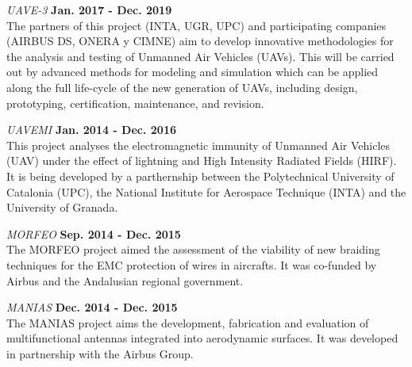 \documentclass[margin,line]{res}
\begin{document}
\begin{resume}

\begin{minipage}{\textwidth}
  {\em UAVE-3} \hfill {\bf Jan. 2017 - Dec. 2019}\\
  The partners of this project (INTA, UGR, UPC) and participating companies (AIRBUS DS, ONERA y CIMNE) aim to develop innovative methodologies for the analysis and testing of Unmanned Air Vehicles (UAVs). This will be carried out by advanced methods for modeling and simulation which can be applied along the full life-cycle of the new generation of UAVs, including design, prototyping, certification, maintenance, and revision.
\end{minipage}

\begin{minipage}{\textwidth}
  {\em UAVEMI} \hfill {\bf Jan. 2014 - Dec. 2016}\\
  This project analyses the electromagnetic immunity of Unmanned Air Vehicles (UAV) under the effect of lightning and High Intensity Radiated Fields (HIRF). It is being developed by a parthernship between the Polytechnical University of Catalonia (UPC), the National Institute for Aerospace Technique (INTA) and the University of Granada.
\end{minipage}

\begin{minipage}{\textwidth}
  {\em MORFEO} \hfill {\bf Sep. 2014 - Dec. 2015}\\
  The MORFEO project aimed the assessment of the viability of new braiding techniques for the EMC protection of wires in aircrafts. It was co-funded by Airbus and the Andalusian regional government.
\end{minipage}

\begin{minipage}{\textwidth}
  {\em MANIAS} \hfill {\bf Dec. 2014 - Dec. 2015}\\
  The MANIAS project aims the development, fabrication and evaluation of multifunctional antennas integrated into aerodynamic surfaces. It was developed in partnership with the Airbus Group.
\end{minipage}


\end{resume}
\end{document}
